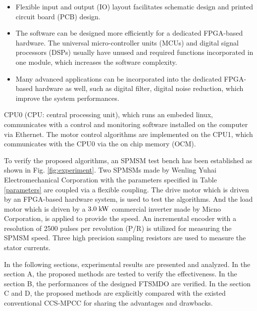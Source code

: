 \documentclass[a4paper, 8pt, twocolumn]{IEEEtran}
\begin{document}
			\begin{itemize}
			\item Flexible input and output (IO) layout facilitates schematic design and printed circuit board (PCB) design.
			\item The software can be designed more efficiently for a dedicated FPGA-based hardware. The universal micro-controller units (MCUs) and digital signal processors (DSPs) usually have unused and required functions incorporated in one module, which increases the software complexity.
			\item Many advanced applications can be incorporated into the dedicated FPGA-based hardware as well, such as digital filter, digital noise reduction, which improve the system performances. 
			\end{itemize}
\fi
CPU0 (CPU: central processing unit), which runs an embeded linux, communicates with a control and monitoring software installed on the computer via Ethernet. The motor control algorithms are implemented on the CPU1, which communicates with the CPU0 via the on chip memory (OCM).\par
To verify the proposed algorithms, an SPMSM test bench has been established as shown in Fig. \ref{fig:experiment}. Two SPMSMs made by Wenling Yuhai Electromechanical Corporation with the parameters specified in Table \ref{parameters} are coupled via a flexible coupling. The drive motor which is driven by an FPGA-based hardware system, is used to test the algorithms. And the load motor which is driven by a $\rm 3.0 \; kW$ commercial inverter made by Micno Corporation, is applied to provide the speed. An incremental encoder with a resolution of 2500 pulses per revolution (P/R) is utilized for measuring the SPMSM speed. Three high precision sampling resistors are used to measure the stator currents.\par
In the following sections, experimental results are presented and analyzed. In the section A, the proposed methods are tested to verify the effectiveness. In the section B, the performances of the designed FTSMDO are verified. In the section C and D, the proposed methods are explicitly compared with the existed conventional CCS-MPCC for sharing the advantages and drawbacks.
\end{document}
